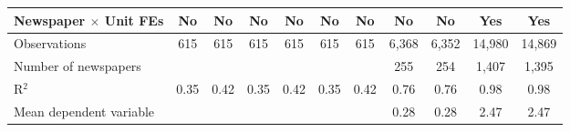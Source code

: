 {\begin{tabular}{l*{10}{c}}
\addlinespace
Newspaper $\times$ Unit FEs &          No         &          No         &          No         &          No         &          No         &          No         &          No         &          No         &         Yes         &         Yes         \\
\midrule
Observations        &         615         &         615         &         615         &         615         &         615         &         615         &       6,368         &       6,352         &      14,980         &      14,869         \\
Number of newspapers&                     &                     &                     &                     &                     &                     &         255         &         254         &       1,407         &       1,395         \\
R$^2$               &        0.35         &        0.42         &        0.35         &        0.42         &        0.35         &        0.42         &        0.76         &        0.76         &        0.98         &        0.98         \\
Mean dependent variable&                     &                     &                     &                     &                     &                     &        0.28         &        0.28         &        2.47         &        2.47         \\
\bottomrule
\end{tabular}
}
